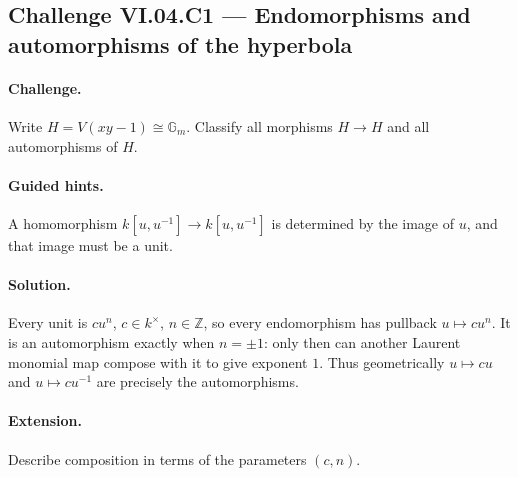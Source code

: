 \subsection*{Challenge VI.04.C1 --- Endomorphisms and automorphisms of the hyperbola}
\label{chal:vi04-c1}
\paragraph{Challenge.}
Write \(H=V(xy-1)\cong\mathbb G_m\).  Classify all morphisms \(H\to H\) and all
automorphisms of \(H\).
\ifdefined\FullProblemDossiers
\paragraph{Guided hints.}  A homomorphism \(k[u,u^{-1}]\to k[u,u^{-1}]\) is determined by
the image of \(u\), and that image must be a unit.
\paragraph{Solution.}
Every unit is \(c u^n\), \(c\in k^\times\), \(n\in\mathbb Z\), so every endomorphism has
pullback \(u\mapsto c u^n\).  It is an automorphism exactly when \(n=\pm1\): only then can
another Laurent monomial map compose with it to give exponent \(1\).  Thus geometrically
\(u\mapsto c u\) and \(u\mapsto c u^{-1}\) are precisely the automorphisms.
\paragraph{Extension.}  Describe composition in terms of the parameters \((c,n)\).
\fi
